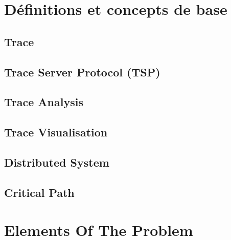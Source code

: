\label{sec:Introduction}  %


\section{Définitions et concepts de base}  %

\subsection{Trace}

\subsection{Trace Server Protocol (TSP)}

\subsection{Trace Analysis}

\subsection{Trace Visualisation}

\subsection{Distributed System}

\subsection{Critical Path}

\clearpage

\section{Elements Of The Problem}  %

